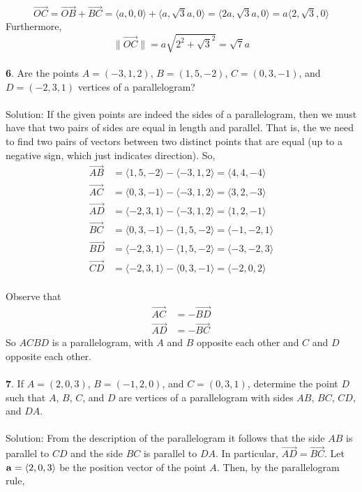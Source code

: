 \documentclass[12pt]{amsbook}
\newcommand{\la}{\langle}
\newcommand{\ra}{\rangle}
\begin{document}
$$\overrightarrow{OC}=\overrightarrow{OB}+\overrightarrow{BC}=\la a,0,0 \ra + \la a,\sqrt{3}a,0 \ra = \la 2a,\sqrt{3}a,0 \ra = a\la 2,\sqrt{3},0 \ra$$
Furthermore,
$$\|\overrightarrow{OC}\|= a\sqrt{2^2+\sqrt{3}^2}=\sqrt{7}a$$
\\
{\small\bf 6}. Are the points $A=(-3,1,2)$, $B=(1,5,-2)$, $C=(0,3,-1)$,
and $D=(-2,3,1)$ vertices of a parallelogram? \\
\\
{\sc Solution}:
If the given points are indeed the sides of a parallelogram, then we must have that two pairs of sides are equal in length and parallel. That is, the we need to find two pairs of vectors between two distinct points that are equal (up to a negative sign, which just indicates direction). So,
\begin{eqnarray*}
\overrightarrow{AB}&=\la 1,5,-2 \ra - \la -3,1,2 \ra = \la 4,4,-4 \ra \\
\overrightarrow{AC}&=\la 0,3,-1 \ra - \la -3,1,2 \ra = \la 3,2,-3 \ra \\
\overrightarrow{AD}&=\la -2,3,1 \ra - \la -3,1,2 \ra = \la 1,2,-1 \ra \\
\overrightarrow{BC}&=\la 0,3,-1 \ra - \la 1,5,-2 \ra  = \la -1,-2,1 \ra \\
\overrightarrow{BD}&=\la -2,3,1 \ra - \la 1,5,-2 \ra = \la -3,-2,3 \ra \\
\overrightarrow{CD}&=\la -2,3,1 \ra - \la 0,3,-1 \ra = \la -2,0,2 \ra 
\end{eqnarray*}
\\
Observe that 
\begin{eqnarray*}
\overrightarrow{AC}&=-\overrightarrow{BD} \\
\overrightarrow{AD}&=-\overrightarrow{BC} 
\end{eqnarray*}
So $ACBD$ is a parallelogram, with $A$ and $B$ opposite each other and $C$ and $D$ opposite each other. 
\\
\\
{\small\bf 7}. If $A=(2,0,3)$, $B=(-1,2,0)$, and $C=(0,3,1)$, determine
the point $D$ such that $A$, $B$, $C$, and $D$ are vertices 
of a parallelogram with sides $AB$, $BC$, $CD$, and $DA$.\\
\\
{\sc Solution}: From the description 
of the parallelogram it follows that the side $AB$ is 
parallel to $CD$ and the side $BC$ is parallel to $DA$.
In particular, $\overrightarrow{AD}=\overrightarrow{BC}$.
Let ${\bf a}=\langle 2,0,3\rangle$ be the position vector 
of the point $A$. Then, by the parallelogram rule, 
\end{document}
